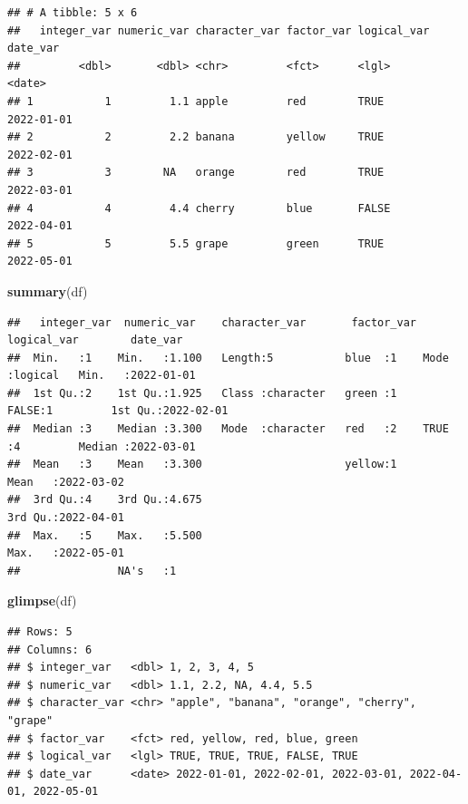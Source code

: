 \documentclass[
  12pt,
  oneside]{book}
\newenvironment{Shaded}{\begin{snugshade}}{\end{snugshade}}
\newcommand{\FunctionTok}[1]{\textcolor[rgb]{0.13,0.29,0.53}{\textbf{#1}}}
\newcommand{\NormalTok}[1]{#1}
\theoremstyle{definition}
\theoremstyle{definition}
\theoremstyle{definition}
\theoremstyle{definition}
\theoremstyle{remark}
\begin{document}
\begin{verbatim}
## # A tibble: 5 x 6
##   integer_var numeric_var character_var factor_var logical_var date_var  
##         <dbl>       <dbl> <chr>         <fct>      <lgl>       <date>    
## 1           1         1.1 apple         red        TRUE        2022-01-01
## 2           2         2.2 banana        yellow     TRUE        2022-02-01
## 3           3        NA   orange        red        TRUE        2022-03-01
## 4           4         4.4 cherry        blue       FALSE       2022-04-01
## 5           5         5.5 grape         green      TRUE        2022-05-01
\end{verbatim}

\begin{Shaded}
\begin{Highlighting}[]
\FunctionTok{summary}\NormalTok{(df)}
\end{Highlighting}
\end{Shaded}

\begin{verbatim}
##   integer_var  numeric_var    character_var       factor_var logical_var        date_var         
##  Min.   :1    Min.   :1.100   Length:5           blue  :1    Mode :logical   Min.   :2022-01-01  
##  1st Qu.:2    1st Qu.:1.925   Class :character   green :1    FALSE:1         1st Qu.:2022-02-01  
##  Median :3    Median :3.300   Mode  :character   red   :2    TRUE :4         Median :2022-03-01  
##  Mean   :3    Mean   :3.300                      yellow:1                    Mean   :2022-03-02  
##  3rd Qu.:4    3rd Qu.:4.675                                                  3rd Qu.:2022-04-01  
##  Max.   :5    Max.   :5.500                                                  Max.   :2022-05-01  
##               NA's   :1
\end{verbatim}

\begin{Shaded}
\begin{Highlighting}[]
\FunctionTok{glimpse}\NormalTok{(df)}
\end{Highlighting}
\end{Shaded}

\begin{verbatim}
## Rows: 5
## Columns: 6
## $ integer_var   <dbl> 1, 2, 3, 4, 5
## $ numeric_var   <dbl> 1.1, 2.2, NA, 4.4, 5.5
## $ character_var <chr> "apple", "banana", "orange", "cherry", "grape"
## $ factor_var    <fct> red, yellow, red, blue, green
## $ logical_var   <lgl> TRUE, TRUE, TRUE, FALSE, TRUE
## $ date_var      <date> 2022-01-01, 2022-02-01, 2022-03-01, 2022-04-01, 2022-05-01
\end{verbatim}
\end{document}
